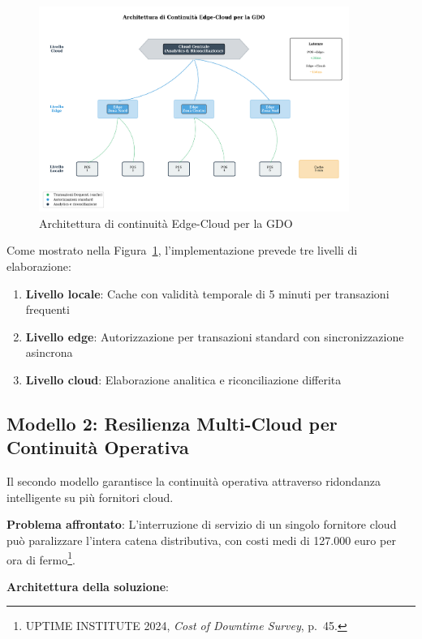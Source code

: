 \documentclass[12pt,a4paper,oneside]{book}
\begin{document}
\begin{figure}[htbp]
\centering
\includegraphics[width=0.9\textwidth]{fig_3_1_edge_cloud_architecture.pdf}
\caption{Architettura di continuità Edge-Cloud per la GDO}
\label{fig:edge-cloud}
\end{figure}

Come mostrato nella Figura~\ref{fig:edge-cloud}, l'implementazione prevede tre livelli di elaborazione:
\begin{enumerate}
    \item \textbf{Livello locale}: Cache con validità temporale di 5 minuti per transazioni frequenti
    \item \textbf{Livello edge}: Autorizzazione per transazioni standard con sincronizzazione asincrona  
    \item \textbf{Livello cloud}: Elaborazione analitica e riconciliazione differita
\end{enumerate}

\subsection{Modello 2: Resilienza Multi-Cloud per Continuità Operativa}
\label{subsec:multi-cloud}

Il secondo modello garantisce la continuità operativa attraverso ridondanza intelligente su più fornitori cloud.

\textbf{Problema affrontato}: L'interruzione di servizio di un singolo fornitore cloud può paralizzare l'intera catena distributiva, con costi medi di 127.000 euro per ora di fermo\footnote{UPTIME INSTITUTE 2024, \textit{Cost of Downtime Survey}, p.~45.}.

\textbf{Architettura della soluzione}:
\end{document}
